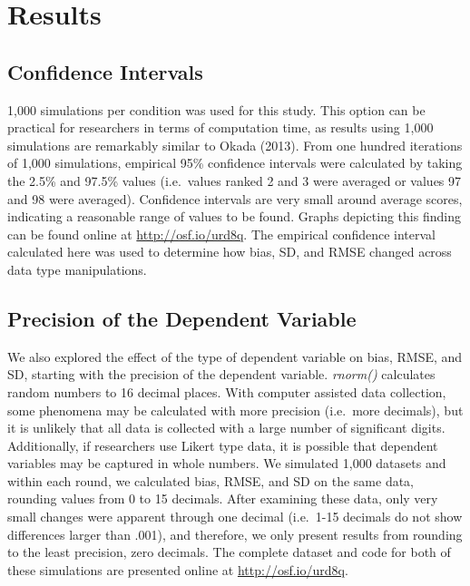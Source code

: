 \documentclass[english,man]{apa6}
\theoremstyle{definition}
\theoremstyle{definition}
\theoremstyle{definition}
\theoremstyle{remark}
\begin{document}
\section{Results}\label{results}

\subsection{Confidence Intervals}\label{confidence-intervals}

1,000 simulations per condition was used for this study. This option can
be practical for researchers in terms of computation time, as results
using 1,000 simulations are remarkably similar to Okada (2013). From one
hundred iterations of 1,000 simulations, empirical 95\% confidence
intervals were calculated by taking the 2.5\% and 97.5\% values
(i.e.~values ranked 2 and 3 were averaged or values 97 and 98 were
averaged). Confidence intervals are very small around average scores,
indicating a reasonable range of values to be found. Graphs depicting
this finding can be found online at \url{http://osf.io/urd8q}. The
empirical confidence interval calculated here was used to determine how
bias, SD, and RMSE changed across data type manipulations.

\subsection{Precision of the Dependent
Variable}\label{precision-of-the-dependent-variable}

We also explored the effect of the type of dependent variable on bias,
RMSE, and SD, starting with the precision of the dependent variable.
\emph{rnorm()} calculates random numbers to 16 decimal places. With
computer assisted data collection, some phenomena may be calculated with
more precision (i.e.~more decimals), but it is unlikely that all data is
collected with a large number of significant digits. Additionally, if
researchers use Likert type data, it is possible that dependent
variables may be captured in whole numbers. We simulated 1,000 datasets
and within each round, we calculated bias, RMSE, and SD on the same
data, rounding values from 0 to 15 decimals. After examining these data,
only very small changes were apparent through one decimal (i.e.~1-15
decimals do not show differences larger than .001), and therefore, we
only present results from rounding to the least precision, zero
decimals. The complete dataset and code for both of these simulations
are presented online at \url{http://osf.io/urd8q}.
\end{document}
